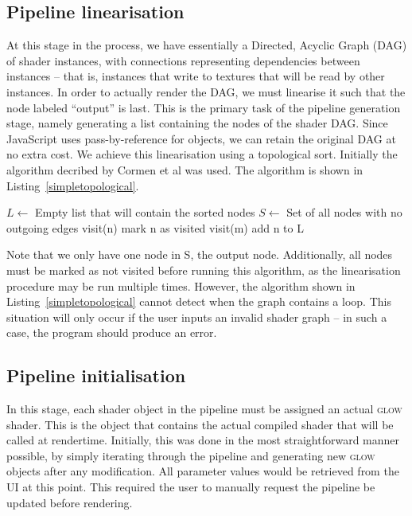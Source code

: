 \documentclass[12pt,twoside,notitlepage]{report}
\begin{document}
\subsection*{Pipeline linearisation}
At this stage in the process, we have essentially a Directed, Acyclic Graph (DAG) of shader instances, with connections representing dependencies between instances -- that is, instances that write to textures that will be read by other instances. In order to actually render the DAG, we must linearise it such that the node labeled ``output'' is last. This is the primary task of the pipeline generation stage, namely generating a list containing the nodes of the shader DAG. Since JavaScript uses pass-by-reference for objects, we can retain the original DAG at no extra cost. We achieve this linearisation using a topological sort. Initially the algorithm decribed by Cormen et al \cite{topsort} was used. The algorithm is shown in Listing~\ref{simpletopological}.
\begin{algorithm}
\label{simpletopological}
\begin{algorithmic}
\State $L \gets $ Empty list that will contain the sorted nodes
\State $S \gets $ Set of all nodes with no outgoing edges
    visit(n)
\EndFor 
{}
        mark n as visited
            visit(m)
        \EndFor
        add n to L
    \EndIf
\EndFunction
\end{algorithmic}
\end{algorithm}
Note that we only have one node in S, the output node. Additionally, all nodes must be marked as not visited before running this algorithm, as the linearisation procedure may be run multiple times. However, the algorithm shown in Listing~\ref{simpletopological} cannot detect when the graph contains a loop. This situation will only occur if the user inputs an invalid shader graph -- in such a case, the program should produce an error.

\subsection*{Pipeline initialisation}
\label{pipe-init}
In this stage, each shader object in the pipeline must be assigned an actual \textsc{glow} shader. This is the object that contains the actual compiled shader that will be called at rendertime. Initially, this was done in the most straightforward manner possible, by simply iterating through the pipeline and generating new \textsc{glow} objects after any modification. All parameter values would be retrieved from the UI at this point. This required the user to manually request the pipeline be updated before rendering. 
\end{document}
